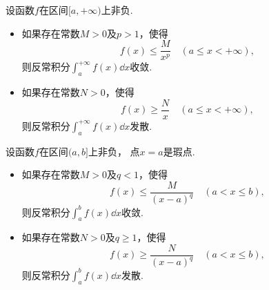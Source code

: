 \begin{theorem}[比较审敛法1]\label{theorem:定积分.无穷限反常积分的比较审敛法}
设函数\(f\)在区间\([a,+\infty)\)上非负.
\begin{itemize}
	\item 如果存在常数\(M>0\)及\(p>1\)，使得\begin{equation*}
		f(x) \leq \frac{M}{x^p}
		\quad(a \leq x < +\infty),
	\end{equation*}
	则反常积分\(\int_a^{+\infty} f(x) \dd{x}\)收敛.
	\item 如果存在常数\(N>0\)，使得\begin{equation*}
		f(x) \geq \frac{N}{x}
		\quad(a \leq x < +\infty),
	\end{equation*}
	则反常积分\(\int_a^{+\infty} f(x) \dd{x}\)发散.
\end{itemize}
\end{theorem}

\begin{theorem}[比较审敛法2]\label{theorem:定积分.无界函数的反常积分的比较审敛法}
设函数\(f\)在区间\((a,b]\)上非负，
点\(x=a\)是瑕点.
\begin{itemize}
	\item 如果存在常数\(M > 0\)及\(q < 1\)，使得\begin{equation*}
		f(x) \leq \frac{M}{(x-a)^q}
		\quad(a < x \leq b),
	\end{equation*}
	则反常积分\(\int_a^b f(x) \dd{x}\)收敛.
	\item 如果存在常数\(N > 0\)及\(q \geq 1\)，使得\begin{equation*}
		f(x) \geq \frac{N}{(x-a)^q}
		\quad(a < x \leq b),
	\end{equation*}
	则反常积分\(\int_a^b f(x) \dd{x}\)发散.
\end{itemize}
\end{theorem}

